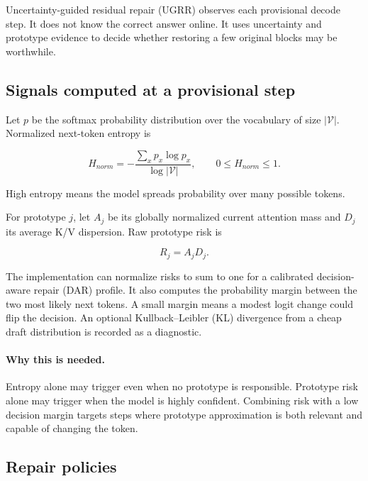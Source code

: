 \documentclass[11pt]{article}
\newcommand{\why}{\paragraph{Why this is needed.}}
\begin{document}
Uncertainty-guided residual repair (UGRR) observes each provisional decode step. It does not know
the correct answer online. It uses uncertainty and prototype evidence to decide whether restoring
a few original blocks may be worthwhile.

\subsection{Signals computed at a provisional step}

Let $p$ be the softmax probability distribution over the vocabulary of size $|\mathcal V|$.
Normalized next-token entropy is

\begin{equation}
  H_{norm}=-\frac{\sum_x p_x\log p_x}{\log |\mathcal V|},
  \qquad 0\le H_{norm}\le1.
\end{equation}

High entropy means the model spreads probability over many possible tokens.

For prototype $j$, let $A_j$ be its globally normalized current attention mass and $D_j$ its
average K/V dispersion. Raw prototype risk is

\begin{equation}
  R_j=A_jD_j.
\end{equation}

The implementation can normalize risks to sum to one for a calibrated decision-aware repair (DAR)
profile. It also computes the probability margin between the two most likely next tokens. A small
margin means a modest logit change could flip the decision. An optional Kullback--Leibler (KL)
divergence from a cheap draft distribution is recorded as a diagnostic.

\why Entropy alone may trigger even when no prototype is responsible. Prototype risk alone may
trigger when the model is highly confident. Combining risk with a low decision margin targets
steps where prototype approximation is both relevant and capable of changing the token.

\subsection{Repair policies}
\end{document}

